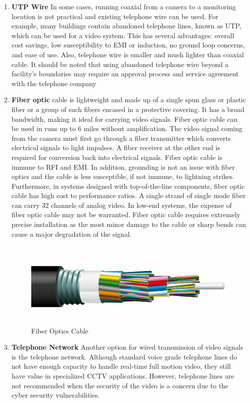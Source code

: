 \documentclass[12pt,fleqn]{book} %
\begin{document}
\begin{itemize}
\begin{enumerate}
        \item \textbf{UTP Wire} In some cases, running coaxial from a camera to a monitoring location is not practical and existing telephone wire can be used. For example, many buildings contain abandoned telephone lines, known as UTP, which can be used for a video system. This has several advantages: overall cost savings, low susceptibility to EMI or induction, no ground loop concerns, and ease of use. Also, telephone wire is smaller and much lighter than coaxial cable. It should be noted that using abandoned telephone wire beyond a facility’s boundaries may require an approval process and service agreement with the telephone company
        \item \textbf{Fiber optic} cable is lightweight and made up of a single spun glass or plastic fiber or a group of such fibers encased in a protective covering. It has a broad bandwidth, making it ideal for carrying video signals. Fiber optic cable can be used in runs up to 6 miles without amplification. The video signal coming from the camera must first go through a fiber transmitter which converts electrical signals to light impulses. A fiber receiver at the other end is required for conversion back into electrical signals. Fiber optic cable is immune to RFI and EMI. In addition, grounding is not an issue with fiber optics and the cable is less susceptible, if not immune, to lightning strikes. Furthermore, in systems designed with top-of-the-line components, fiber optic cable has high cost to performance ratios. A single strand of single mode fiber can carry 32 channels of analog video. In low-end systems, the expense of fiber optic cable may not be warranted. Fiber optic cable requires extremely precise installation as the most minor damage to the cable or sharp bends can cause a major degradation of the signal.
                             \begin{figure}[!h]
    \centering
    \includegraphics[width=0.5\linewidth]{c 17.png}
    \caption{Fiber Optics Cable }
    \label{fig:c 17}
    \end{figure}
    
        \item \textbf{Telephone Network} Another option for wired transmission of video signals is the telephone network. Although standard voice grade telephone lines do not have enough capacity to handle real-time full motion video, they still have value in specialized CCTV applications. However, telephone lines are not recommended when the security of the video is a concern due to the cyber security vulnerabilities. 


\end{enumerate}
\end{itemize}
\end{document}
